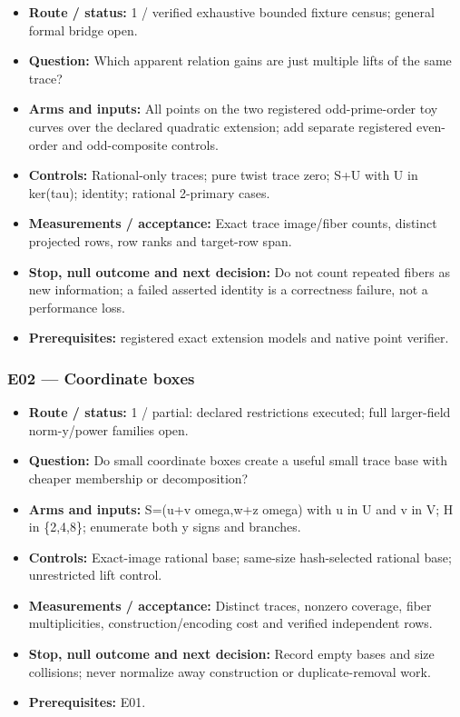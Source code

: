 \documentclass[
  10pt,
]{article}
\providecommand{\tightlist}{%
  \setlength{\itemsep}{0pt}\setlength{\parskip}{0pt}}
\begin{document}
\begin{itemize}
\tightlist
\item
  \textbf{Route / status:} 1 / verified exhaustive bounded fixture
  census; general formal bridge open.
\item
  \textbf{Question:} Which apparent relation gains are just multiple
  lifts of the same trace?
\item
  \textbf{Arms and inputs:} All points on the two registered
  odd-prime-order toy curves over the declared quadratic extension; add
  separate registered even-order and odd-composite controls.
\item
  \textbf{Controls:} Rational-only traces; pure twist trace zero; S+U
  with U in ker(tau); identity; rational 2-primary cases.
\item
  \textbf{Measurements / acceptance:} Exact trace image/fiber counts,
  distinct projected rows, row ranks and target-row span.
\item
  \textbf{Stop, null outcome and next decision:} Do not count repeated
  fibers as new information; a failed asserted identity is a correctness
  failure, not a performance loss.
\item
  \textbf{Prerequisites:} registered exact extension models and native
  point verifier.
\end{itemize}

\subsubsection{E02 --- Coordinate boxes}\label{e02-coordinate-boxes}

\begin{itemize}
\tightlist
\item
  \textbf{Route / status:} 1 / partial: declared restrictions executed;
  full larger-field norm-y/power families open.
\item
  \textbf{Question:} Do small coordinate boxes create a useful small
  trace base with cheaper membership or decomposition?
\item
  \textbf{Arms and inputs:} S=(u+v omega,w+z omega) with u in U and v in
  V; H in \{2,4,8\}; enumerate both y signs and branches.
\item
  \textbf{Controls:} Exact-image rational base; same-size hash-selected
  rational base; unrestricted lift control.
\item
  \textbf{Measurements / acceptance:} Distinct traces, nonzero coverage,
  fiber multiplicities, construction/encoding cost and verified
  independent rows.
\item
  \textbf{Stop, null outcome and next decision:} Record empty bases and
  size collisions; never normalize away construction or
  duplicate-removal work.
\item
  \textbf{Prerequisites:} E01.
\end{itemize}
\end{document}
